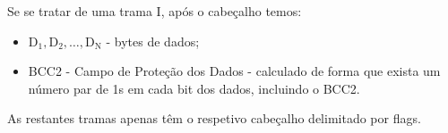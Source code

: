 \documentclass[11pt,a4paper,reqno]{report}
\numberwithin{equation}{section}
\begin{document}
\begin{appendices}
Se se tratar de uma trama I, após o cabeçalho temos:
\begin{itemize}
	\item $\text{D}_{\text{1}}, \text{D}_{\text{2}}, \ldots, \text{D}_{\text{N}}$ - bytes de dados;
	\item BCC2 - Campo de Proteção dos Dados - calculado de forma que exista um número par de 1s em cada bit dos dados, incluindo o BCC2.
\end{itemize}

As restantes tramas apenas têm o respetivo cabeçalho delimitado por flags.


\end{appendices}
\end{document}
